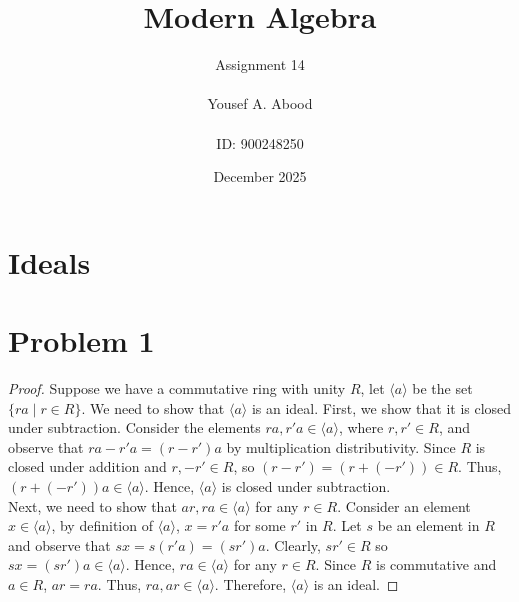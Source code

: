 \documentclass[a4paper,12pt]{article}
\title{Modern Algebra}
\author{Assignment 14\\ \\ Yousef A. Abood\\ \\ ID: 900248250}
\date{December 2025}
\begin{document}
\maketitle
\noindent\makebox[\linewidth]{\rule{15cm}{0.4pt}}
\section{Ideals}
\section*{Problem 1}
\begin{proof}
    Suppose we have a commutative ring with unity $R$, let $\langle a \rangle$ be the set $\{ra \mid r \in R\}.$
    We need to show that $\langle a \rangle$ is an ideal. First, we show that it is closed under subtraction. Consider the elements $ra, r'a \in \langle a \rangle$, where $r, r' \in R$, and observe that $ra-r'a=(r-r')a$ by multiplication distributivity. Since $R$ is closed under addition and $r, -r' \in R$, so $(r-r')=(r+(-r')) \in R.$ Thus, $(r+(-r'))a \in \langle a \rangle$. Hence, $\langle a \rangle$ is closed under subtraction.\\ 
    Next, we need to show that $ar, ra \in \langle a \rangle$ for any $r \in R.$ Consider an element $x \in \langle a \rangle$, by definition of $\langle a \rangle$, $x =r'a$ for some $r'$ in $R.$ Let $s$ be an element in $R$ and observe that $sx=s(r'a)=(sr')a$. Clearly, $sr' \in R$ so $sx=(sr')a \in \langle a \rangle.$ Hence, $ra \in \langle a \rangle$ for any $r \in R$. Since $R$ is commutative and $a \in R$, $ar=ra$. Thus, $ra, ar \in \langle a \rangle.$ Therefore, $\langle a \rangle$ is an ideal.     
\end{proof}
\end{document}
